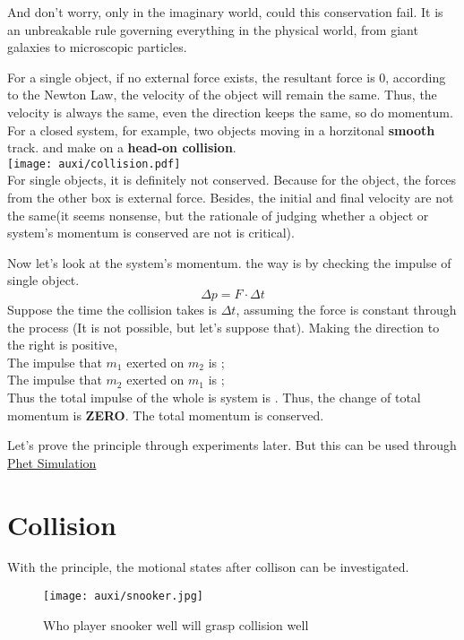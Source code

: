 \documentclass[a4paper]{tufte-handout}
\newenvironment{ExampleBox} %
{\begin{tcolorbox}[breakable,colback=g1!30,colframe=g1,title=Example]} {\end{tcolorbox}}
\begin{document}
And don't worry, only in the imaginary world, could this conservation fail. It is an unbreakable rule governing everything in the physical world, from giant galaxies to microscopic particles.

\begin{ExampleBox}
For a single object, if no external force exists, the resultant force is 0, according to the Newton \uline{\hspace{1.5 in}} Law, the velocity of the object will remain the same. Thus, the velocity is always the same, even the direction keeps the same, so do momentum.
\tcblower
For a closed system, for example, two objects moving in a horzitonal \textbf{smooth} track. and make on a \textbf{head-on collision}. \\
\texttt{[image: auxi/collision.pdf]}\\
For single objects, it is definitely not conserved. Because for the object, the forces from the other box is external force. Besides, the initial and final velocity are not the same(it seems nonsense, but the rationale of judging whether a object or system's momentum is conserved are not is critical).

Now let's look at the system's momentum. the way is by checking the impulse of single object.
\[
  \Delta p = F\cdot \Delta t
\]
Suppose the time the collision takes is $\Delta t$, assuming the force is constant through the process (It is not possible, but let's suppose that). Making the direction to the right is positive,\\
The impulse that $m_1$ exerted on $m_2$ is \uline{\hfill};\\
The impulse that $m_2$ exerted on $m_1$ is \uline{\hfill};\\

Thus the total impulse of the whole is system is \uline{\hfill}. Thus, the change of total momentum is \textbf{ZERO}. The total momentum is conserved.

Let's prove the principle through experiments later. But this can be used through \href{https://phet.colorado.edu/sims/html/collision-lab/latest/collision-lab_en.html}{Phet Simulation}
\end{ExampleBox}

\section{Collision}
With the principle, the motional states after collison can be investigated.
\begin{figure}
\centering
\texttt{[image: auxi/snooker.jpg]}
\caption{Who player snooker well will grasp collision well}
\end{figure}
\end{document}
